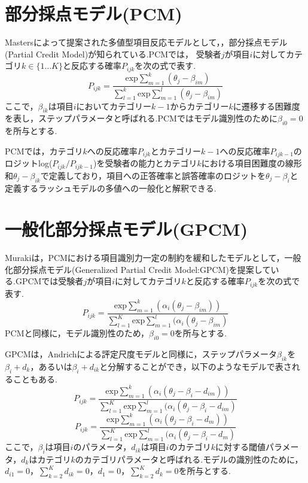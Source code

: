 \documentclass[a4paper，11pt，oneside，openany]{jsbook}
\begin{document}
\section{部分採点モデル(PCM)}
Mastersによって提案された多値型項目反応モデルとして，，部分採点モデル(Partial Credit Model)\cite{PCM}が知られている.PCMでは， 受験者$j$が項目$i$に対してカテゴリ$k \in \{1\dots K\}$と反応する確率$P_{ijk}$を次の式で表す.
\begin{displaymath}
P_{ijk} = \frac{\mathrm{exp}\sum_{m=1}^{k}(\theta_{j}-\beta_{im})}{\sum_{l=1}^{k} \mathrm{exp}\sum_{m=1}^{l}(\theta_{j}-\beta_{im})}
\end{displaymath}
ここで，$\beta_{ik}$は項目$i$においてカテゴリー$k-1$からカテゴリー$k$に遷移する困難度を表し，ステップパラメータと呼ばれる.PCMではモデル識別性のために$\beta_{i0}=0$を所与とする.

PCMでは，カテゴリ$k$への反応確率$P_{ijk}$とカテゴリー$k-1$への反応確率$P_{ijk-1}$のロジットlog($P_{ijk}/P_{ijk-1}$)を受験者の能力とカテゴリ$k$における項目困難度の線形和$\theta_{j}-\beta_{ik}$で定義しており，項目への正答確率と誤答確率のロジットを$\theta_{j}-\beta_{i}$と定義するラッシュモデルの多値への一般化と解釈できる.

\section{一般化部分採点モデル(GPCM)}
Murakiは，PCMにおける項目識別力一定の制約を緩和したモデルとして，一般化部分採点モデル(Generalized Partial Credit Model:GPCM)\cite{GPCM}を提案している.GPCMでは受験者$j$が項目$i$に対してカテゴリ$k$と反応する確率$P_{ijk}$を次の式で表す.
\begin{displaymath}
P_{ijk} = \frac{\mathrm{exp}\sum_{m=1}^{k}(\alpha_{i}(\theta_{j}-\beta_{im}))}{\sum_{l=1}^{K} \mathrm{exp}\sum_{m=1}^{l}(\alpha_{i}(\theta_{j}-\beta_{im})}
\end{displaymath}
PCMと同様に，モデル識別性のため，$\beta_{i0}=0$を所与とする.

GPCMは，Andrichによる評定尺度モデル\cite{RSM}と同様に，ステップパラメータ$\beta_{ik}$を$\beta_{i}+d_{k}$，あるいは$\beta_{i}+d_{ik}$と分解することができ，以下のようなモデルで表されることもある.
\begin{displaymath}
P_{ijk} = \frac{\mathrm{exp}\sum_{m=1}^{k}(\alpha_{i}(\theta_{j}-\beta_{i}-d_{im}))}{\sum_{l=1}^{K} \mathrm{exp}\sum_{m=1}^{l}(\alpha_{i}(\theta_{j}-\beta_{i}-d_{im})}
\end{displaymath}
\begin{displaymath}
P_{ijk} = \frac{\mathrm{exp}\sum_{m=1}^{k}(\alpha_{i}(\theta_{j}-\beta_{i}-d_{m}))}{\sum_{l=1}^{K} \mathrm{exp}\sum_{m=1}^{l}(\alpha_{i}(\theta_{j}-\beta_{i}-d_{m})}
\end{displaymath}
ここで，$\beta_{i}$は項目$i$のパラメータ，$d_{ik}$は項目$i$のカテゴリ$k$に対する閾値パラメータ，$d_k$はカテゴリ$k$のカテゴリパラメータと呼ばれる.モデルの識別性のために，$d_{i1}=0，\sum_{k=2}^{K}d_{ik}=0，d_1=0，\sum_{k=2}^{K}d_{k}=0$を所与とする.
\end{document}
